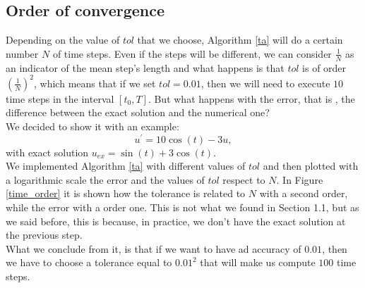 \subsection{Order of convergence}
Depending on the value of $ tol $ that we choose, Algorithm \ref{ta} will do a certain number $ N $ of time steps. Even if the steps will be different, we can consider $ \frac{1}{N} $ as an indicator of the mean step's length and what happens is that $ tol$ is of order $ (\frac{1}{N})^2 $, which means that if we set $ tol = 0.01 $, then we will need to execute $ 10 $ time steps in the interval $ [t_0, T] $. But what happens with the error, that is , the difference between the exact solution and the numerical one? \\
We decided to show it with an example:
\begin{equation*}
u^\prime = 10 \cos (t) - 3u,
\end{equation*}
with exact solution $ u_{ex} = \sin (t) + 3 \cos (t) $. \\
We implemented Algorithm \ref{ta} with different values of $ tol $ and then plotted with a logarithmic scale the error and the values of $ tol $ respect to $ N $.
In Figure \ref{time_order} it is shown how the tolerance is related to $ N $ with a second order, while the error with a order one. This is not what we found in Section 1.1, but as we said before, this is because, in practice, we don't have the exact solution at the previous step. \\
What we conclude from it, is that if we want to have ad accuracy of $ 0.01 $, then we have to choose a tolerance equal to $ 0.01^2 $ that will make us compute $ 100 $ time steps.
